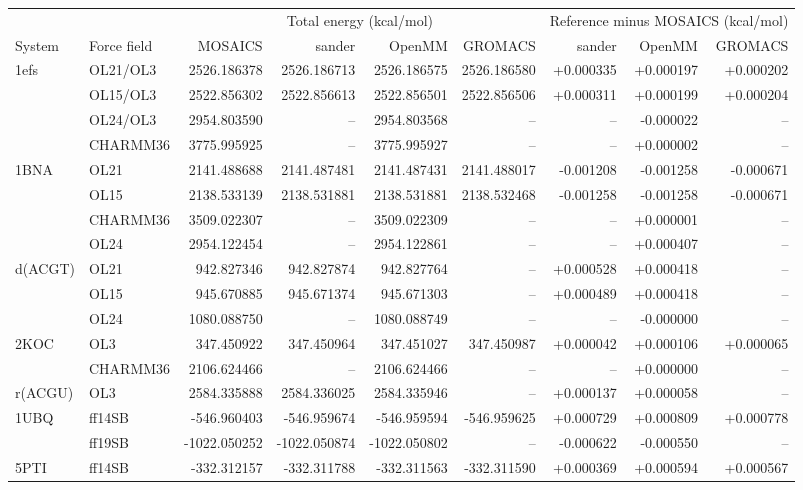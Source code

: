 \begin{tabular}{@{}llrrrrrrr@{}}
\toprule
 & & \multicolumn{4}{c}{Total energy (kcal/mol)} & \multicolumn{3}{c}{Reference minus MOSAICS (kcal/mol)} \\
\cmidrule(lr){3-6}\cmidrule(lr){7-9}
System & Force field & MOSAICS & sander & OpenMM & GROMACS & sander & OpenMM & GROMACS \\
\midrule
1efs & OL21/OL3 & 2526.186378 & 2526.186713 & 2526.186575 & 2526.186580 & +0.000335 & +0.000197 & +0.000202 \\
 & OL15/OL3 & 2522.856302 & 2522.856613 & 2522.856501 & 2522.856506 & +0.000311 & +0.000199 & +0.000204 \\
 & OL24/OL3 & 2954.803590 & -- & 2954.803568 & -- & -- & -0.000022 & -- \\
 & CHARMM36 & 3775.995925 & -- & 3775.995927 & -- & -- & +0.000002 & -- \\
1BNA & OL21 & 2141.488688 & 2141.487481 & 2141.487431 & 2141.488017 & -0.001208 & -0.001258 & -0.000671 \\
 & OL15 & 2138.533139 & 2138.531881 & 2138.531881 & 2138.532468 & -0.001258 & -0.001258 & -0.000671 \\
 & CHARMM36 & 3509.022307 & -- & 3509.022309 & -- & -- & +0.000001 & -- \\
 & OL24 & 2954.122454 & -- & 2954.122861 & -- & -- & +0.000407 & -- \\
d(ACGT) & OL21 & 942.827346 & 942.827874 & 942.827764 & -- & +0.000528 & +0.000418 & -- \\
 & OL15 & 945.670885 & 945.671374 & 945.671303 & -- & +0.000489 & +0.000418 & -- \\
 & OL24 & 1080.088750 & -- & 1080.088749 & -- & -- & -0.000000 & -- \\
2KOC & OL3 & 347.450922 & 347.450964 & 347.451027 & 347.450987 & +0.000042 & +0.000106 & +0.000065 \\
 & CHARMM36 & 2106.624466 & -- & 2106.624466 & -- & -- & +0.000000 & -- \\
r(ACGU) & OL3 & 2584.335888 & 2584.336025 & 2584.335946 & -- & +0.000137 & +0.000058 & -- \\
1UBQ & ff14SB & -546.960403 & -546.959674 & -546.959594 & -546.959625 & +0.000729 & +0.000809 & +0.000778 \\
 & ff19SB & -1022.050252 & -1022.050874 & -1022.050802 & -- & -0.000622 & -0.000550 & -- \\
5PTI & ff14SB & -332.312157 & -332.311788 & -332.311563 & -332.311590 & +0.000369 & +0.000594 & +0.000567 \\

\end{tabular}
